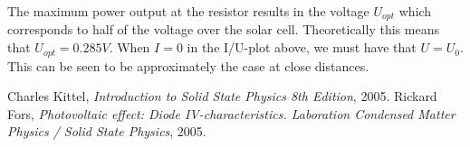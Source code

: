 \documentclass[a4paper,twoside=false,abstract=false,numbers=noenddot,
titlepage=false,headings=small,parskip=half,version=last]{scrartcl}
\begin{document}
The maximum power output at the resistor results in the voltage $ U_{opt}$ which corresponds to half of the voltage over the solar cell. Theoretically this means that $U_{opt} = 0.285 V$. When $I=0$ in the I/U-plot above, we must have that $U = U_0$. This can be seen to be approximately the case at close distances.


\begin{thebibliography}{1}
        Charles Kittel,
        {\em Introduction to Solid State Physics 8th Edition},
        2005.
		Rickard Fors,
		{\em Photovoltaic effect: Diode IV-characteristics. Laboration Condensed Matter Physics / Solid State Physics},
		2005.
\end{thebibliography}
\end{document}
